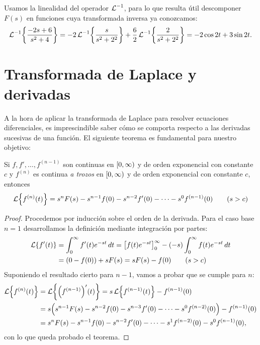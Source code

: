 \documentclass[../ecuaciones_diferenciales.tex]{subfiles}
\begin{document}
\begin{solution}
	Usamos la linealidad del operador \(\operatorname{\mathcal{L}}^{-1}\), para lo que resulta útil
	descomponer \(F(s)\) en funciones cuya transformada inversa ya conozcamos:
	\[\laplace^{-1}\left\{\frac{-2s+6}{s^2+4}\right\} =
		-2\laplace^{-1}\left\{\frac{s}{s^2+2^2}\right\} +
		\frac{6}{2}\laplace^{-1}\left\{\frac{2}{s^2+2^2}\right\} = -2 \cos 2t + 3 \sin 2t.\]
\end{solution}

\section{Transformada de Laplace y derivadas}
A la hora de aplicar la transformada de Laplace para resolver ecuaciones
diferenciales, es imprescindible saber cómo se comporta respecto a las derivadas
sucesivas de una función. El siguiente teorema es fundamental para nuestro
objetivo:

\begin{theorem}
	Si \(f, f', \dots, f^{(n-1)}\) son continuas en \(\closedopen{0}{\infty}\) y de orden
	exponencial con constante \(c\) y \(f^{(n)}\) es continua \emph{a trozos} en
	\(\closedopen{0}{\infty}\) y de orden exponencial con constante \(c\), entonces
	\[\laplace\left\{f^{(n)}(t)\right\} = s^n F(s) - s^{n-1}f(0) - s^{n-2}f'(0) - \cdots -
		s^0f^{(n-1)}(0) \qquad (s>c)\]
	\begin{proof}
		Procedemos por inducción sobre el orden de la derivada. Para el caso base
		\(n=1\) desarrollamos la definición mediante integración por partes:
		\begin{align*}
			\laplace\{f'(t)\} & = \int_0^\infty f'(t)e^{-st} \dif t =
			\intmargins{f(t)e^{-st}}{0}{\infty} - (-s) \int_0^\infty f(t)e^{-st} \dif t \\
			            & = (0-f(0)) + sF(s) = sF(s) - f(0) \qquad (s > c)
		\end{align*}
		Suponiendo el resultado cierto para \(n-1\), vamos a probar que se cumple
		para \(n\):
		\begin{align*}
			\laplace\left\{f^{(n)}(t)\right\}
			 & = \laplace\left\{\left(f^{(n-1)}\right)'(t)\right\}
			= s\laplace\left\{f^{(n-1)}(t)\right\} - f^{(n-1)}(0)        \\
			 & = s \left( s^{n-1}F(s) - s^{n-2}f(0) - s^{n-3}f'(0)
			- \cdots - s^0f^{(n-2)}(0) \right) - f^{(n-1)}(0)      \\
			 & = s^n F(s) - s^{n-1} f(0) - s^{n-2} f'(0) - \cdots
			- s^1f^{(n-2)}(0) - s^0f^{(n-1)}(0),
		\end{align*}
		con lo que queda probado el teorema.
	\end{proof}
\end{theorem}
\end{document}
